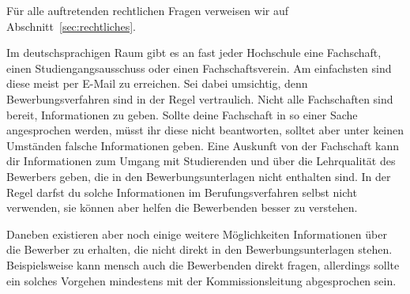 Für alle auftretenden rechtlichen Fragen verweisen wir auf Abschnitt~\ref{sec:rechtliches}.

Im deutschsprachigen Raum gibt es an fast jeder Hochschule eine Fachschaft, einen Studiengangsausschuss oder einen Fachschaftsverein. 
Am einfachsten sind diese meist per E-Mail zu erreichen. 
Sei dabei umsichtig, denn Bewerbungsverfahren sind in der Regel vertraulich.
Nicht alle Fachschaften sind bereit, Informationen zu geben.
Sollte deine Fachschaft in so einer Sache angesprochen werden, müsst ihr diese nicht beantworten, solltet aber unter keinen Umständen falsche Informationen geben.
Eine Auskunft von der Fachschaft kann dir Informationen zum Umgang mit Studierenden und über die Lehrqualität des Bewerbers geben, die in den Bewerbungsunterlagen nicht enthalten sind.
In der Regel darfst du solche Informationen im Berufungsverfahren selbst nicht verwenden, sie können aber helfen die Bewerbenden besser zu verstehen.

Daneben existieren aber noch einige weitere Möglichkeiten Informationen über die Bewerber zu erhalten, die nicht direkt in den Bewerbungsunterlagen stehen.
Beispielsweise kann mensch auch die Bewerbenden direkt fragen, allerdings sollte ein solches Vorgehen mindestens mit der Kommissionsleitung abgesprochen sein.


